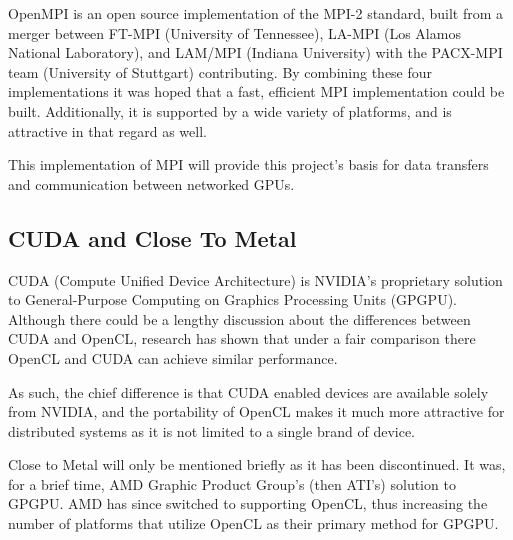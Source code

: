 
        OpenMPI is an open source implementation of the MPI-2 standard, built from a merger between FT-MPI (University of Tennessee), LA-MPI (Los Alamos National Laboratory), and LAM/MPI (Indiana University) with the PACX-MPI team (University of Stuttgart) contributing. By combining these four implementations it was hoped that a fast, efficient MPI implementation could be built.\cite{openmpiwebsite} Additionally, it is supported by a wide variety of platforms, and is attractive in that regard as well.

        This implementation of MPI will provide this project's basis for data transfers and communication between networked GPUs.
    
    \subsection{CUDA and Close To Metal} %
    \label{sub:cuda_and_close_to_metal}
        CUDA (Compute Unified Device Architecture) is NVIDIA's proprietary solution to General-Purpose Computing on Graphics Processing Units (GPGPU). Although there could be a lengthy discussion about the differences between CUDA and OpenCL, research has shown that under a fair comparison there OpenCL and CUDA can achieve similar performance\cite{6047190}.

        As such, the chief difference is that CUDA enabled devices are available solely from NVIDIA\cite{cudagpus}, and the portability of OpenCL makes it much more attractive for distributed systems as it is not limited to a single brand of device.

        Close to Metal will only be mentioned briefly as it has been discontinued. It was, for a brief time, AMD Graphic Product Group's (then ATI's) solution to GPGPU. AMD has since switched to supporting OpenCL, thus increasing the number of platforms that utilize OpenCL as their primary method for GPGPU.

